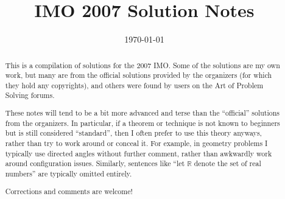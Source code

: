 \documentclass[11pt]{scrartcl}
\title{IMO 2007 Solution Notes}
\date{\today}
\begin{document}
\maketitle

\begin{abstract}
This is a compilation of solutions
for the 2007 IMO.
Some of the solutions are my own work,
but many are from the official solutions provided by the organizers
(for which they hold any copyrights),
and others were found by users on the Art of Problem Solving forums.

These notes will tend to be a bit more advanced and terse than the ``official''
solutions from the organizers.
In particular, if a theorem or technique is not known to beginners
but is still considered ``standard'', then I often prefer to
use this theory anyways, rather than try to work around or conceal it.
For example, in geometry problems I typically use directed angles
without further comment, rather than awkwardly work around configuration issues.
Similarly, sentences like ``let $\mathbb{R}$ denote the set of real numbers''
are typically omitted entirely.

Corrections and comments are welcome!
\end{abstract}

\tableofcontents
\newpage

\addtocounter{section}{-1}
\end{document}
